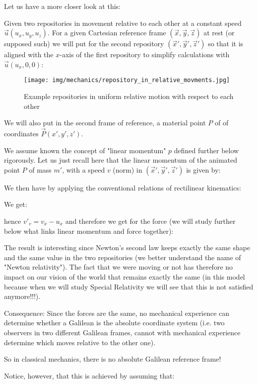 	Let us have a more closer look at this:

	Given two repositories in movement relative to each other at a constant speed $\vec{u}(u_x,u_y,u_z)$. For a given Cartesian reference frame $(\vec{x},\vec{y},\vec{z})$ at rest (or supposed such) we will put for the second  repository $(\vec{x}',\vec{y}',\vec{z}')$ so that it is aligned with the $x$-axis of the first repository to simplify calculations with $\vec{u}(u_x,0,0)$:
	\begin{figure}[H]
		\centering
		\texttt{[image: img/mechanics/repository\_in\_relative\_movments.jpg]}
		\caption{Example repositories in uniform relative motion with respect to each other}
	\end{figure}
	We will also put in the second frame of reference, a material point $P$  of of coordinates $\vec{P}(x',y',z')$.
	\begin{tcolorbox}[title=Remarks,colframe=black,arc=10pt]
	We assume known the concept of "linear momentum" $p$ defined further below rigorously. Let us just recall here that the linear momentum of the animated point $P$ of mass $m'$, with a speed $v$ (norm) in $(\vec{x}',\vec{y}',\vec{z}')$ is given by:
	
	\end{tcolorbox}
	We then have by applying the conventional relations of rectilinear kinematics:
	
	We get:
	
	hence ${v'}_v=v_x-u_x$ and therefore we get for the force (we will study further below what links linear momentum and force together):
	
	The result is interesting since Newton's second law keeps exactly the same shape and the same value in the two repositories (we better understand the name of "Newton relativity"). The fact that we were moving or not has therefore no impact on our vision of the world that remains exactly the same (in this model because when we will study Special Relativity we will see that this is not satisfied anymore!!!).
	
	Consequence: Since the forces are the same, no mechanical experience can determine whether a Galilean is the absolute coordinate system (i.e. two observers in two different Galilean frames, cannot with mechanical experience determine which moves relative to the other one).
	
	
	So in classical mechanics, there is no absolute Galilean reference frame!
	
	Notice, however, that this is achieved by assuming that:
	
